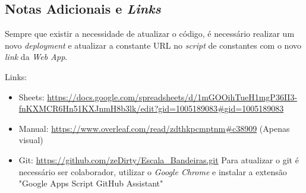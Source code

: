 \subsection{Notas Adicionais e \textit{Links}}

Sempre que existir a necessidade de atualizar o código, é necessário realizar um novo \textit{deployment} e atualizar a constante URL no \textit{script} de constantes com o novo \textit{link} da \textit{Web App}.

Links:
\begin{itemize}
    \item Sheets: \url{https://docs.google.com/spreadsheets/d/1mGOOihTueH1mgP36II3-fnKXMCR6Hn51KXJnmH8b3lk/edit?gid=1005189083#gid=1005189083}
    \item Manual: \url{https://www.overleaf.com/read/zdthkpcmptnm#c38909} (Apenas visual)
    \item Git: \url{https://github.com/zeDirty/Escala_Bandeiras.git} Para atualizar o git é necessário ser colaborador, utilizar o \textit{Google Chrome} e instalar a extensão "Google Apps Script GitHub Assistant"
\end{itemize}